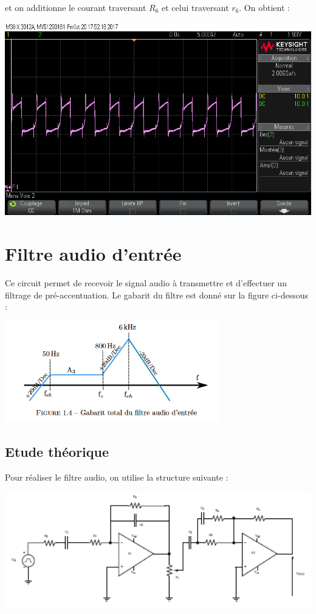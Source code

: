 \documentclass[a4paper]{report}
\begin{document}
et on additionne le courant traversant $R_6$ et celui traversant $r_6$. On obtient :

\begin{center}
\includegraphics[width=1\textwidth]{Courant_diode_opt.png}
\end{center}
\newpage
\chapter{Filtre audio d'entrée}

Ce circuit permet de recevoir le signal audio à transmettre et d'effectuer un filtrage de pré-accentuation. Le gabarit du filtre est donné sur la figure ci-dessous :

\begin{center}
\includegraphics[width=0.7\textwidth]{gabarit_total.PNG}
\end{center}

\section{Etude théorique}

Pour réaliser le filtre audio, on utilise la structure suivante :

\begin{center}
\includegraphics[width=1\textwidth]{montage_filtre_audio.PNG}
\end{center}
\end{document}

